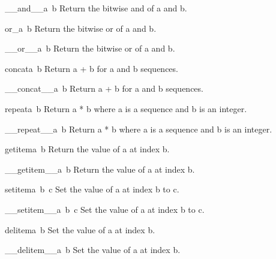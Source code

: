 \begin{funcdesc}{\_\_and\_\_}{a\, b}
Return the bitwise and of a and b.
\end{funcdesc}

\begin{funcdesc}{or\_}{a\, b}
Return the bitwise or of a and b.
\end{funcdesc}

\begin{funcdesc}{\_\_or\_\_}{a\, b}
Return the bitwise or of a and b.
\end{funcdesc}

\begin{funcdesc}{concat}{a\, b}
Return a + b for a and b sequences.
\end{funcdesc}

\begin{funcdesc}{\_\_concat\_\_}{a\, b}
Return a + b for a and b sequences.
\end{funcdesc}

\begin{funcdesc}{repeat}{a\, b}
Return a * b where a is a sequence and b is an integer.
\end{funcdesc}

\begin{funcdesc}{\_\_repeat\_\_}{a\, b}
Return a * b where a is a sequence and b is an integer.
\end{funcdesc}

\begin{funcdesc}{getitem}{a\, b}
Return the value of a at index b.
\end{funcdesc}

\begin{funcdesc}{\_\_getitem\_\_}{a\, b}
Return the value of a at index b.
\end{funcdesc}

\begin{funcdesc}{setitem}{a\, b\, c}
Set the value of a at index b to c.
\end{funcdesc}

\begin{funcdesc}{\_\_setitem\_\_}{a\, b\, c}
Set the value of a at index b to c.
\end{funcdesc}

\begin{funcdesc}{delitem}{a\, b}
Set the value of a at index b.
\end{funcdesc}

\begin{funcdesc}{\_\_delitem\_\_}{a\, b}
Set the value of a at index b.
\end{funcdesc}

